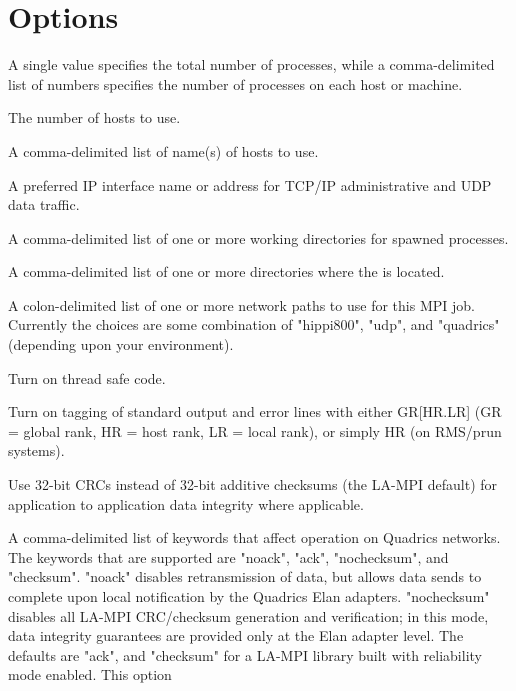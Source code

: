 \documentclass[english]{article}
\begin{document}
\section{Options}
\begin{Description}\setlength{\itemsep}{0cm}
\item[\Opt{-n}\Bar\Opt{-np} \Arg{ number of processes}] A single value specifies the total number of processes, while a 
comma-delimited list of numbers specifies the number of processes on each host or machine. 
\item[\OptArg{-N}{ number of hosts}] The number of hosts to use.
\item[\OptArg{-H}{ hostlist}] A comma-delimited list of name(s) of hosts to use.
\item[\OptArg{-s}{ mpirunhost}] A preferred IP interface name or address for TCP/IP administrative and UDP data traffic.
\item[\OptArg{-d}{ wdir}] A comma-delimited list of one or more working directories for spawned processes.
\item[\OptArg{-dapp}{ edir}] A comma-delimited list of one or more directories where the  is located.
\item[\OptArg{-dev}{ netpaths}] A colon-delimited list of one or more network paths to use for this MPI job. Currently the choices
are some combination of "hippi800", "udp", and "quadrics" (depending upon your environment).
\item[\Opt{-threads}] Turn on thread safe code.
\item[\Opt{-t}] Turn on tagging of standard output and error lines with either GR[HR.LR] (GR = global rank, HR = host rank, LR = local rank), 
or simply HR (on RMS/prun systems).
\item[\Opt{-crc}] Use 32-bit CRCs instead of 32-bit additive checksums (the LA-MPI default) for application to application data integrity
where applicable.
\item[\OptArg{-qf}{ flaglist}] A comma-delimited list of keywords that affect operation on Quadrics networks. The keywords that are supported
are "noack", "ack", "nochecksum", and "checksum". "noack" disables retransmission of data, but allows data sends to complete upon local notification
by the Quadrics Elan adapters. "nochecksum" disables all LA-MPI CRC/checksum generation and verification; in this mode, data integrity guarantees are
provided only at the Elan adapter level. The defaults are "ack", and "checksum" for a LA-MPI library built with reliability mode enabled. This option

\end{Description}
\end{document}
